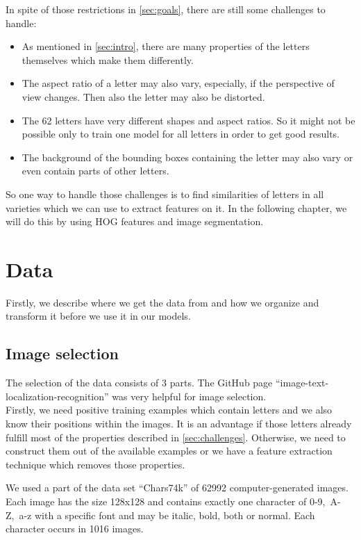 \documentclass[conference]{IEEEtran}
\begin{document}
In spite of those restrictions in \ref{sec:goals}, there are still some challenges to handle:
\begin{itemize}
\item As mentioned in \ref{sec:intro}, there are many properties of the letters themselves which make them differently.
\item The aspect ratio of a letter may also vary, especially, if the perspective of view changes. Then also the letter may also be distorted.
\item The 62 letters have very different shapes and aspect ratios. So it might not be possible only to train one model for all letters in order to get good results.
\item The background of the bounding boxes containing the letter may also vary or even contain parts of other letters.
\end{itemize}
So one way to handle those challenges is to find similarities of letters in all varieties which we can use to extract features on it. In the following chapter, we will do this by using HOG features and image segmentation.

\section{Data}

\noindent
Firstly, we describe where we get the data from and how we organize and transform it before we use it in our models.

\subsection{Image selection}\label{sec:img-sel}

The selection of the data consists of 3 parts. The GitHub page ``image-text-localization-recognition'' \cite{bib:github} was very helpful for image selection. \\[-5pt]

Firstly, we need positive training examples which contain letters and we also know their positions within the images. It is an advantage if those letters already fulfill most of the properties described in \ref{sec:challenges}. Otherwise, we need to construct them out of the available examples or we have a feature extraction technique which removes those properties.

We used a part of the data set ``Chars74k'' \cite{bib:chars74k} of 62992 computer-generated images. Each image has the size 128x128 and contains exactly one character of \mbox{0-9, A-Z, a-z} with a specific font and may be italic, bold, both or normal. Each character occurs in 1016 images. \\[-5pt]
\end{document}
